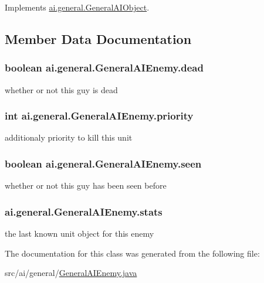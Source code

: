 Implements \hyperlink{classai_1_1general_1_1_general_a_i_object_adcb52382eaf3447f61640f6aca6225f6}{ai.general.GeneralAIObject}.



\subsection{Member Data Documentation}
\hypertarget{classai_1_1general_1_1_general_a_i_enemy_a00043e01ec4356d4a673ceb7d3ff4990}{
\subsubsection[{dead}]{\setlength{\rightskip}{0pt plus 5cm}boolean {\bf ai.general.GeneralAIEnemy.dead}}}
\label{classai_1_1general_1_1_general_a_i_enemy_a00043e01ec4356d4a673ceb7d3ff4990}
whether or not this guy is dead \hypertarget{classai_1_1general_1_1_general_a_i_enemy_abdcc6550ac64a4bd7ffb14d2b3aa9b08}{
\subsubsection[{priority}]{\setlength{\rightskip}{0pt plus 5cm}int {\bf ai.general.GeneralAIEnemy.priority}}}
\label{classai_1_1general_1_1_general_a_i_enemy_abdcc6550ac64a4bd7ffb14d2b3aa9b08}
additionaly priority to kill this unit \hypertarget{classai_1_1general_1_1_general_a_i_enemy_aa778be6f916aabee5103959fdddc3aa9}{
\subsubsection[{seen}]{\setlength{\rightskip}{0pt plus 5cm}boolean {\bf ai.general.GeneralAIEnemy.seen}}}
\label{classai_1_1general_1_1_general_a_i_enemy_aa778be6f916aabee5103959fdddc3aa9}
whether or not this guy has been seen before \hypertarget{classai_1_1general_1_1_general_a_i_enemy_a722f790fd65127c725643ce9752fd8c4}{
\subsubsection[{stats}]{ {\bf ai.general.GeneralAIEnemy.stats}}}
\label{classai_1_1general_1_1_general_a_i_enemy_a722f790fd65127c725643ce9752fd8c4}
the last known unit object for this enemy 

The documentation for this class was generated from the following file:\begin{DoxyCompactItemize}
\item 
src/ai/general/\hyperlink{_general_a_i_enemy_8java}{GeneralAIEnemy.java}\end{DoxyCompactItemize}
